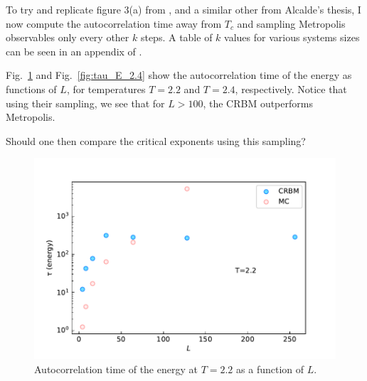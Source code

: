 \documentclass[12pt]{article}
\newcommand{\Figref}[1]{Fig.~\ref{#1}}
\begin{document}
To try and replicate figure 3(a) from \cite{Alcalde_Puente_2020}, and a similar other from Alcalde's thesis, I now compute the autocorrelation time away from $T_c$ and sampling Metropolis observables only every other $k$ steps. A table of $k$ values for various systems sizes can be seen in an appendix of \cite{Alcalde_Puente_2020}.

\Figref{fig:tau_E_2.2} and \Figref{fig:tau_E_2.4} show the autocorrelation time of the energy as functions of $L$, for temperatures $T=2.2$ and $T=2.4$, respectively. Notice that using their sampling, we see that for $L>100$, the CRBM outperforms Metropolis.

Should one then compare the critical exponents using this sampling?

\begin{figure}[h!]
\begin{center}
    \includegraphics[width=1.0\columnwidth]{../figures/L_many_T_2.2_J1_-1.0_J2_0.0_seed_1968_kernelDims_2-2_analytical_autocorr_E.pdf}
\end{center}
\caption{Autocorrelation time of the energy at $T=2.2$ as a function of $L$.}
\label{fig:tau_E_2.2}
\end{figure}
\end{document}
